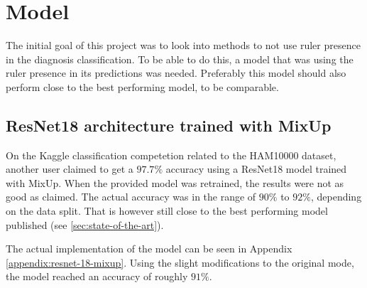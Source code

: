 \chapter{Model}\label{sec:model}
The initial goal of this project was to look into methods to not use ruler presence in the
diagnosis classification.
To be able to do this, a model that was using the ruler presence in its predictions was needed.
Preferably this model should also perform close to the best performing model, to be comparable.

\section{ResNet18 architecture trained with MixUp}
On the Kaggle classification competetion related to the HAM10000 dataset\cite{HAM10000-kaggle-competetion},
another user claimed to get a $97.7\%$ accuracy using a ResNet18 model trained with MixUp\cite{kaggle-97-model}.
When the provided model was retrained, the results were not as good as claimed.
The actual accuracy was in the range of $90\%$ to $92\%$, depending on the data split.
That is however still close to the best performing model published (see \ref{sec:state-of-the-art}).

The actual implementation of the model can be seen in Appendix \ref{appendix:resnet-18-mixup}.
Using the slight modifications to the original mode, the model reached an accuracy of roughly $91\%$.
